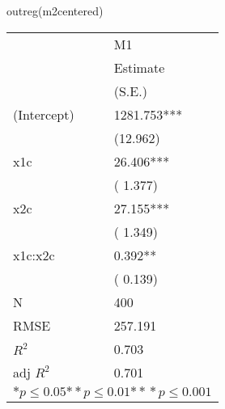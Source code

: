\begin{Schunk}
\begin{Sinput}
 outreg(m2centered)
\end{Sinput}
\begin{tabular}{*{2}{l}}
\hline
                  & M1   \tabularnewline
                   &Estimate \tabularnewline
                 &(S.E.) \tabularnewline
 \hline
 \hline
   (Intercept)     &1281.753*** \tabularnewline
                 &(12.962)  \tabularnewline
   x1c             &26.406*** \tabularnewline
                 &( 1.377)  \tabularnewline
   x2c             &27.155*** \tabularnewline
                 &( 1.349)  \tabularnewline
   x1c:x2c         &0.392** \tabularnewline
                 &( 0.139)  \tabularnewline
 \hline
 N                 &400       \tabularnewline
 RMSE             &257.191   \tabularnewline
 $R^2$             &0.703   \tabularnewline
 adj $R^2$         &0.701   \tabularnewline
 \hline
\hline
 
 \multicolumn{2}{c}{${*  p}\le 0.05$${*\!\!*  p}\le 0.01$${*\!\!*\!\!*  p}\le 0.001$}\tabularnewline
 \end{tabular}\end{Schunk}
